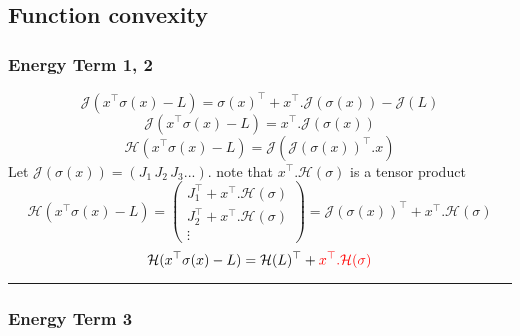 \documentclass[11pt]{article}
\theoremstyle{definition}
\begin{document}
\subsection*{Function convexity}

\subsubsection*{Energy Term 1, 2}

\begin{dmath}
	\mathcal{J}(x^\top \sigma(x) - L) = \sigma(x)^\top + x^\top . \mathcal{J}(\sigma(x)) - \mathcal{J}(L)
\end{dmath}
%
\begin{dmath}
	\mathcal{J}(x^\top \sigma(x) - L) =  x^\top . \mathcal{J}(\sigma(x))
\end{dmath}
%
\begin{dmath}
	\mathcal{H}(x^\top \sigma(x) - L) =   \mathcal{J}(\mathcal{J}(\sigma(x))^\top . x)
\end{dmath}
%
Let $\mathcal{J}(\sigma(x)) = (J_1 \, J_2 \, J_3 ...)$. note that $x^\top . \mathcal{H}(\sigma)$ is a tensor product
%
\begin{equation}
    \mathcal{H}(x^\top \sigma(x) - L) = \begin{pmatrix}
        J_1^\top + x^\top . \mathcal{H}(\sigma) \\
        J_2^\top + x^\top . \mathcal{H}(\sigma) \\
        \vdots 
    \end{pmatrix} = \mathcal{J}(\sigma(x))^\top + x^\top . \mathcal{H}(\sigma)
\end{equation}
%
\begin{equation}
    \mathcal{H}(x^\top \sigma(x) - L) = \mathcal{H}(L)^\top + \textcolor{red}{x^\top . \mathcal{H}(\sigma)}
\end{equation}
%
\noindent\rule{8cm}{0.4pt} %

\subsubsection*{Energy Term 3}
\end{document}
